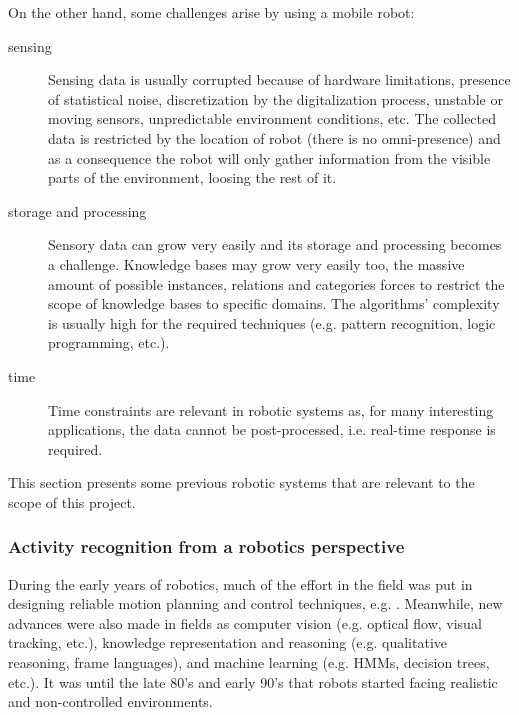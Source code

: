 On the other hand, some challenges arise by using a mobile robot:
\begin{description}
\item[sensing] Sensing data is usually corrupted because of hardware limitations, presence of statistical noise, discretization by the digitalization process, unstable or moving sensors, unpredictable environment conditions, etc.
The collected data is restricted by the location of robot (there is no omni-presence) and as a consequence the robot will only gather information from the visible parts of the environment, loosing the rest of it.
\item[storage and processing] %
Sensory data can grow very easily and its storage and processing becomes a challenge.
Knowledge bases may grow very easily too, the massive amount of possible instances, relations and categories forces to restrict the scope of knowledge bases to specific domains. %
The algorithms' complexity is usually high for the required techniques (e.g. pattern recognition, logic programming, etc.). 
\item[time] Time constraints are relevant in robotic systems as, for many interesting applications, the data cannot be post-processed, i.e. real-time response is required.
\end{description}

This section presents some previous robotic systems that are relevant to the scope of this project.

\subsubsection{Activity recognition from a robotics perspective}

During the early years of robotics, much of the effort in the field was put in designing reliable motion planning and control techniques, e.g. \citep{Moravec1983_StanfordCMUCarts,brook-1985:robuslayer:TR}. 
Meanwhile, new advances were also made in fields as computer vision (e.g. optical flow, visual tracking, etc.), knowledge representation and reasoning (e.g. qualitative reasoning, frame languages), and machine learning (e.g. HMMs, decision trees, etc.).
It was until the late 80's and early 90's that robots started facing realistic and non-controlled environments.

